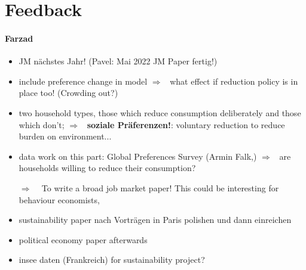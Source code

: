 \documentclass[12pt]{article}
\newcommand{\ar}{$\Rightarrow$ \ }
\begin{document}
\section{Feedback}
\paragraph{Farzad}
\begin{itemize}
\item JM nächstes Jahr! (Pavel: Mai 2022 JM Paper fertig!)
\item include preference change in model \ar what effect if reduction policy is in place too!  (Crowding out?)
\item two household types, those which reduce consumption deliberately and those which don't; \ar \textbf{soziale Präferenzen!}: voluntary reduction to reduce burden on environment...
\item data work on this part: Global Preferences Survey (Armin Falk,) \ar are households willing to reduce their consumption?
\item[\ar] To write a broad job market paper! This could be interesting for behaviour economists, 
\item sustainability paper nach Vorträgen in Paris polishen und dann einreichen
\item  political economy paper afterwards
\item insee daten (Frankreich) for sustainability project?
\end{itemize}
\clearpage

\end{document}
